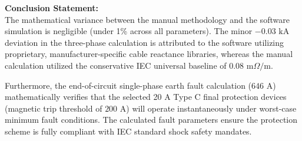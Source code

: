 \documentclass[11pt, a4paper]{article}
\begin{document}
\textbf{Conclusion Statement:} \\
The mathematical variance between the manual methodology and the software simulation is negligible (under 1\% across all parameters). The minor $-0.03 \text{ kA}$ deviation in the three-phase calculation is attributed to the software utilizing proprietary, manufacturer-specific cable reactance libraries, whereas the manual calculation utilized the conservative IEC universal baseline of $0.08 \text{ m}\Omega/\text{m}$. 

Furthermore, the end-of-circuit single-phase earth fault calculation ($646 \text{ A}$) mathematically verifies that the selected 20 A Type C final protection devices (magnetic trip threshold of $200 \text{ A}$) will operate instantaneously under worst-case minimum fault conditions. The calculated fault parameters ensure the protection scheme is fully compliant with IEC standard shock safety mandates.
\end{document}
